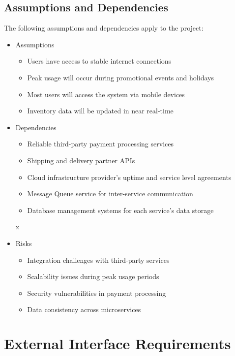 \documentclass[oneside,a4paper,12pt,explicit]{book}
\begin{document}
\section{Assumptions and Dependencies}
The following assumptions and dependencies apply to the project:

\begin{itemize}
    \item Assumptions
    \begin{itemize}
        \item Users have access to stable internet connections
        \item Peak usage will occur during promotional events and holidays
        \item Most users will access the system via mobile devices
        \item Inventory data will be updated in near real-time
    \end{itemize}
    
    \item Dependencies
    \begin{itemize}
        \item Reliable third-party payment processing services
        \item Shipping and delivery partner APIs
        \item Cloud infrastructure provider's uptime and service level agreements
        \item Message Queue service for inter-service communication
        \item Database management systems for each service's data storage
    \end{itemize}
    x
    \item Risks
    \begin{itemize}
        \item Integration challenges with third-party services
        \item Scalability issues during peak usage periods
        \item Security vulnerabilities in payment processing
        \item Data consistency across microservices
    \end{itemize}
\end{itemize}

\chapter{External Interface Requirements}
\end{document}
